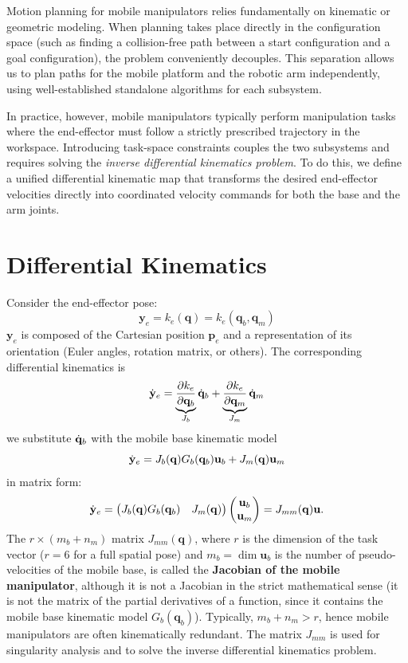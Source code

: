 \documentclass[10pt, a4paper]{report}
\newcommand{\y}{{\mathbf y}}
\newcommand{\q}{{\mathbf q}}
\begin{document}
Motion planning for mobile manipulators relies fundamentally on kinematic or geometric modeling. When planning takes place directly in the configuration space (such as finding a collision-free path between a start configuration and a goal configuration), the problem conveniently decouples. This separation allows us to plan paths for the mobile platform and the robotic arm independently, using well-established standalone algorithms for each subsystem.

In practice, however, mobile manipulators typically perform manipulation tasks where the end-effector must follow a strictly prescribed trajectory in the workspace. Introducing task-space constraints couples the two subsystems and requires solving the \emph{inverse differential kinematics problem}. To do this, we define a unified differential kinematic map that transforms the desired end-effector velocities directly into coordinated velocity commands for both the base and the arm joints.
\section{Differential Kinematics}
Consider the end-effector pose:\begin{equation}
    \y_e=k_e(\q)=k_e(\q_b,\q_m)
\end{equation}
$\y_e$ is composed of the Cartesian position $\mathbf p_e$ and a representation of its orientation (Euler angles, rotation matrix, or others). The corresponding differential kinematics is\begin{equation}
    \dy_e=\underbrace{\frac{\partial k_e}{\partial \q_b}}_{J_b}\dq_b+\underbrace{\frac{\partial k_e}{\partial \q_m}}_{J_m}\dq_m
\end{equation}
we substitute ${\dot{\mathbf q}}_b$ with the mobile base kinematic model
\begin{equation}
    \dy_e=J_b(\q)G_b(\q_b)\mathbf u_b+J_m(\q)\mathbf u_m
\end{equation}
in matrix form:\begin{equation}
    \dy_e=\begin{pmatrix}
        J_b(\q)G_b(\q_b) & J_m(\q)
    \end{pmatrix}\begin{pmatrix}
        \mathbf u_b\\ \mathbf u_m 
    \end{pmatrix}=J_{mm}(\q)\mathbf u.
\end{equation}
The $r\times (m_b+n_m)$ matrix $J_{mm}(\q)$, where $r$ is the dimension of the task vector ($r=6$ for a full spatial pose) and $m_b=\dim\mathbf u_b$ is the number of pseudo-velocities of the mobile base, is called the \textbf{Jacobian of the mobile manipulator}, although it is not a Jacobian in the strict mathematical sense (it is not the matrix of the partial derivatives of a function, since it contains the mobile base kinematic model $G_b(\q_b)$). Typically, $m_b+n_m>r$, hence mobile manipulators are often kinematically redundant. The matrix $J_{mm}$ is used for singularity analysis and to solve the inverse differential kinematics problem.
\end{document}
